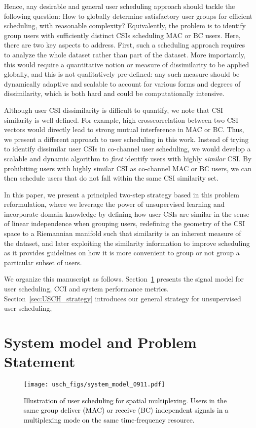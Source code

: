 Hence, any desirable and general user scheduling approach should tackle the following question:
How to globally determine satisfactory user groups for efficient scheduling, with reasonable complexity? Equivalently, the problem 
is to identify group users with 
sufficiently distinct CSIs 
scheduling MAC or BC users.
Here, there are two key aspects to address. First, such a scheduling approach requires to analyze the whole dataset rather than part of the dataset. More importantly, this would require a quantitative notion or measure of dissimilarity to be applied globally, and this is not qualitatively pre-defined: 
any such measure should be 
dynamically adaptive and scalable 
to account for various forms and degrees of dissimilarity, which is both hard and could be computationally intensive.

Although
user CSI dissimilarity is difficult to
quantify, we note that CSI similarity is well defined. For example, high crosscorrelation
between two CSI vectors would directly 
lead to strong mutual interference in MAC or BC.
Thus, we present a different approach to user
scheduling in this work.  Instead of trying
to identify dissimilar user CSIs in
co-channel user scheduling, we
would develop a scalable and dynamic algorithm
to \emph{first} identify users with highly \emph{similar} CSI.
By prohibiting users with highly similar CSI as co-channel MAC or BC users, we can then schedule users that do not fall within the same CSI similarity set. 

In this paper, we present a principled two-step strategy based in this problem reformulation, where we leverage the power of unsupervised learning and incorporate domain knowledge by defining how user CSIs are similar in the sense of linear independence when grouping users, redefining the geometry of the CSI space to a Riemannian manifold such that similarity is an inherent measure of the dataset, and later exploiting the similarity information to improve scheduling as it provides guidelines on how it is more convenient to group or not group a particular subset of users. 

We organize this manuscript as follows. Section~\ref{sec:USCH_systemmodel} presents the signal model for user scheduling, CCI and system performance metrics.
Section~\ref{sec:USCH_strategy} introduces our general strategy for unsupervised user scheduling, 


\section{System model and Problem Statement}\label{sec:USCH_systemmodel}
\begin{figure}[tb]
	\centering
	\texttt{[image: usch\_figs/system\_model\_0911.pdf]}\\
	\caption{\textcolor{black}{Illustration of user scheduling for spatial multiplexing. Users in the same group deliver (MAC) or receive (BC) independent signals in a multiplexing mode on the same time-frequency resource.}}\label{fig:usch_system_model}
\end{figure}

